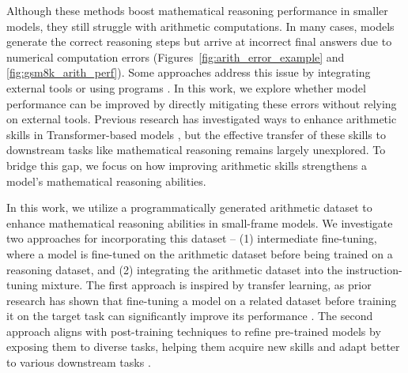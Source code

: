Although these methods boost mathematical reasoning performance in smaller models, they still struggle with arithmetic computations. In many cases, models generate the correct reasoning steps but arrive at incorrect final answers due to numerical computation errors (Figures~\ref{fig:arith_error_example} and \ref{fig:gsm8k_arith_perf}). Some approaches address this issue by integrating external tools \citep{cobbe2021training, schick2023toolformer} or using programs \citep{pmlr-v202-gao23f, chen2023program, ye_satlm_2023}. In this work, we explore whether model performance can be improved by directly mitigating these errors without relying on external tools. Previous research has investigated ways to enhance arithmetic skills in Transformer-based models \citep{liu2023goat, mcleish2024transformers}, but the effective transfer of these skills to downstream tasks like mathematical reasoning remains largely unexplored. To bridge this gap, we focus on how improving arithmetic skills strengthens a model's mathematical reasoning abilities.

In this work, we utilize a programmatically generated arithmetic dataset to enhance mathematical reasoning abilities in small-frame models. We investigate two approaches for incorporating this dataset -- (1) intermediate fine-tuning, where a model is fine-tuned on the arithmetic dataset before being trained on a reasoning dataset, and (2) integrating the arithmetic dataset into the instruction-tuning mixture. The first approach is inspired by transfer learning, as prior research has shown that fine-tuning a model on a related dataset before training it on the target task can significantly improve its performance \citep{vu-etal-2020-exploring, phang2018sentence, pruksachatkun2020intermediate}. The second approach aligns with post-training techniques to refine pre-trained models by exposing them to diverse tasks, helping them acquire new skills and adapt better to various downstream tasks \citep{wei2021finetuned, chung2024scaling, lambert2024t}.

